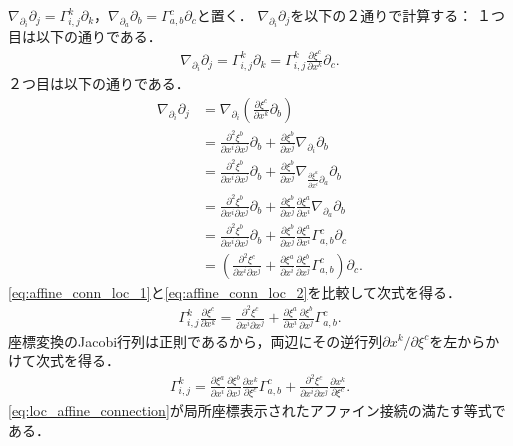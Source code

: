 \documentclass{MochiMochi}
\begin{document}
$\nabla_{\partial_i} \partial_j = \Gamma_{i,j}^k \partial_k$，$\nabla_{\partial_a} \partial_b = \Gamma_{a,b}^c \partial_c$と置く．
$\nabla_{\partial_i} \partial_j$を以下の２通りで計算する：
１つ目は以下の通りである．
\begin{align}\label{eq:affine_conn_loc_1}
    \nabla_{\partial_i} \partial_j = \Gamma_{i,j}^k \partial_k = \Gamma_{i,j}^k \frac{\partial \xi^c}{\partial x^k} \partial_c.
\end{align}
２つ目は以下の通りである．
\begin{align}
    \nabla_{\partial_i} \partial_j&= \nabla_{\partial_i}\left(\frac{\partial \xi^c}{\partial x^k} \partial_b\right)\\
    &= \frac{\partial^2 \xi^b}{\partial x^i \partial x^j} \partial_b + \frac{\partial \xi^b}{\partial x^j} \nabla_{\partial_i} \partial_b\\
    &=\frac{\partial^2 \xi^b}{\partial x^i \partial x^j} \partial_b + \frac{\partial \xi^b}{\partial x^j} \nabla_{\frac{\partial \xi^a}{\partial x^i}\partial_a} \partial_b\\
    &=\frac{\partial^2 \xi^b}{\partial x^i \partial x^j} \partial_b + \frac{\partial \xi^b}{\partial x^j} \frac{\partial \xi^a}{\partial x^i}\nabla_{\partial_a} \partial_b\\
    &=\frac{\partial^2 \xi^b}{\partial x^i \partial x^j} \partial_b + \frac{\partial \xi^b}{\partial x^j} \frac{\partial \xi^a}{\partial x^i}\Gamma_{a,b}^c \partial_c\\
    &=\left(\frac{\partial^2 \xi^c}{\partial x^i \partial x^j}  + \frac{\partial \xi^a}{\partial x^i}\frac{\partial \xi^b}{\partial x^j} \Gamma_{a,b}^c \right)\partial_c.\label{eq:affine_conn_loc_2}
\end{align}
\eqref{eq:affine_conn_loc_1}と\eqref{eq:affine_conn_loc_2}を比較して次式を得る．
\begin{align}
    \Gamma_{i,j}^k \frac{\partial \xi^c}{\partial x^k} = \frac{\partial^2 \xi^c}{\partial x^i \partial x^j}  + \frac{\partial \xi^a}{\partial x^i}\frac{\partial \xi^b}{\partial x^j} \Gamma_{a,b}^c.
\end{align}
座標変換のJacobi行列は正則であるから，両辺にその逆行列$\partial x^k/\partial \xi^c$を左からかけて次式を得る．
\begin{align}\label{eq:loc_affine_connection}
    \Gamma_{i,j}^k =\frac{\partial \xi^a}{\partial x^i}\frac{\partial \xi^b}{\partial x^j}\frac{\partial x^k}{\partial \xi^c} \Gamma_{a,b}^c + \frac{\partial^2 \xi^c}{\partial x^i \partial x^j}\frac{\partial x^k}{\partial \xi^c}.
\end{align}
\eqref{eq:loc_affine_connection}が局所座標表示されたアファイン接続の満たす等式である．
\end{document}
